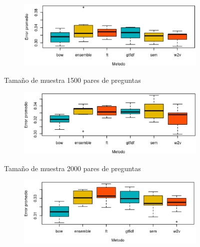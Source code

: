 \begin{frame}
\begin{figure}[!htb]
\begin{minipage}{.45\textwidth}
\begin{figure}
				\vspace*{-0.3cm}
				\centering
				\includegraphics[width=\textwidth]{../10_resultados/imagenes/anova_1000}
			\end{figure}
		\end{minipage}
		\begin{minipage}{.45\textwidth}
			\begin{tiny}
				Tamaño de muestra 1500 pares de preguntas
			\end{tiny}
			\begin{figure}
				\vspace*{-0.3cm}
				\centering
				\includegraphics[width=\textwidth]{../10_resultados/imagenes/anova_1500}
			\end{figure}
		\end{minipage}
		\begin{minipage}{.45\textwidth}
			\begin{tiny}
				Tamaño de muestra 2000 pares de preguntas
			\end{tiny}
			\begin{figure}
				\vspace*{-0.3cm}
				\centering
				\includegraphics[width=\textwidth]{../10_resultados/imagenes/anova_2000}
			\end{figure}
		\end{minipage}
	\end{figure}

	\framebreak

	\normalsize
\end{frame}


